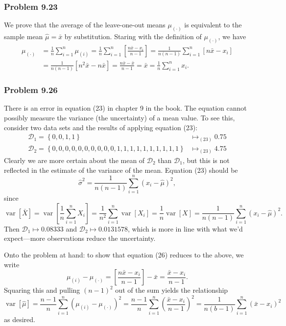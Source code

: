 \documentclass[12pt, a4paper]{article}
\newcommand{\D}{\mathcal{D}}
\DeclareMathOperator{\var}{\operatorname{var}}
\begin{document}
{\subsubsection*{Problem 9.23}
We prove that the average of the leave-one-out means $\mu_{(\cdot)}$ is equivalent to the sample mean $\hat{\mu} = \bar{x}$ by substitution.
Staring with the definition of $\mu_{(\cdot)}$, we have
\begin{align*}
	\mu_{(\cdot)} &= \frac{1}{n} \sum_{i=1}^{n} \mu_{(i)}
	= \frac{1}{n} \sum_{i=1}^{n} \left[  \frac{n \bar{x} - x_i}{n-1} \right]
	= \frac{1}{n(n-1)} \sum_{i=1}^{n} \left[  n \bar{x} - x_i \right] \\
	&= \frac{1}{n(n-1)} \left[ n^2 \bar{x} - n \bar{x} \right]
	=
	\frac{n\bar{x} - \bar{x}}{n-1} = \bar{x} = \frac{1}{n} \sum_{i=1}^{n} x_i.
\end{align*}

\subsubsection*{Problem 9.26}
There is an error in equation (23) in chapter 9 in the book.
The equation cannot possibly measure the variance (the uncertainty) of a mean value.
To see this, consider two data sets and the results of applying equation (23):
\begin{align*}
	\D_1 = \left\{0,0,1, 1\right\}  & \mapsto_{(23)} 0.75 \\ 
	\D_2 = \left\{0,0,0,0,0,0,0,0,0,0,1,1,1,1,1,1,1,1,1,1\right\}  & \mapsto_{(23)} 4.75
\end{align*}
Clearly we are more certain about the mean of $\D_2$ than $\D_1$, but this is not reflected in the estimate of the variance of the mean.
Equation (23) should be
\begin{equation*}
\hat{\sigma}^2 = \frac{1}{n (n-1)} \sum_{i=1}^{n} \left( x_i - \hat{\mu} \right)^2,
\end{equation*}
since
\begin{equation*}
	\var \left[ \bar{X} \right] = \var \left[ \frac{1}{n} \sum_{i=1}^{n}  X_i \right]
	= \frac{1}{n^2} \sum_{i=1}^{n} \var \left[    X_i \right]
	= \frac{1}{n} \var \left[    X \right]
	= \frac{1}{n (n-1)} \sum_{i=1}^{n} \left( x_i - \hat{\mu} \right)^2.
\end{equation*}
Then $\D_1  \mapsto 0.08333$ and $\D_2  \mapsto 0.0131578$, which is more in line with what we'd expect---more observations reduce the uncertainty.

Onto the problem at hand: to show that equation (26) reduces to the above, we write
\begin{equation*}
	\mu_{(i)} - \mu_{(\cdot)} = \left[  \frac{n \bar{x} - x_i}{n-1} \right] - \bar{x} = \frac{\bar{x} - x_i}{n-1}.
\end{equation*}
Squaring this and pulling $(n-1)^2$ out of the sum yields the relationship
\begin{equation*}
	\var \left[ \hat{\mu} \right] = \frac{n-1}{n} 
	\sum_{i=1}^{n} \left( \mu_{(i)} - \mu_{(\cdot)} \right)^2
	= \frac{n-1}{n} 
	\sum_{i=1}^{n} \left( \frac{\bar{x} - x_i}{n-1} \right)^2
	= \frac{1}{n (b-1)} 
	\sum_{i=1}^{n} \left(\bar{x} - x_i \right)^2
\end{equation*}
as desired.


}
\end{document}
